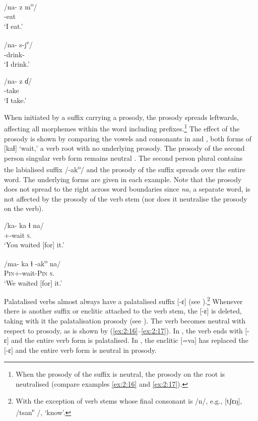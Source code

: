 \ea \label{ex:2:11}
\gll {[nɔ-zɔm]}   \hspace{10pt}   /na-  z m\textsuperscript{o}/\\
      {\oneS}-eat\\
\glt  ‘I eat.’
\z

\ea \label{ex:2:12}
\gll {[nɛ-ʃ-ɛ]}  /na-  s-j\textsuperscript{e}/\\
      {\oneS}-drink-{\CL}\\
\glt  ‘I drink.’
\z

\ea \label{ex:2:13}
\gll {[na-zaɗ]}  \hspace{10pt}    /na-  z ɗ/\\
      {\oneS}-take\\
\glt  ‘I take.’
\z

\largerpage
When initiated by a suffix carrying a prosody, the prosody spreads leftwards, affecting all morphemes within the word including prefixes.\footnote{When the prosody of the suffix is neutral, the prosody on the root is neutralised (compare examples \ref{ex:2:16} and \ref{ex:2:17}).} The effect of the prosody is shown by comparing the vowels and consonants in  and , both forms of [kaɬ] ‘wait,’ a verb root with no underlying prosody. The prosody of the second person singular verb form remains neutral . The second person plural contains the labialised suffix /-ak\textsuperscript{o}/  and the prosody of the suffix spreads over the entire word. The underlying forms are given in each example. Note that the prosody does not spread to the right across word boundaries since \textit{na}, a separate word, is not affected by the prosody of the verb stem (nor does it neutralise the prosody on the verb).

\ea \label{ex:2:14}
\gll [kà-kaɬ na] {\hspace{60pt}} /ka-  ka ɬ  na/\\
      {\twoS}+{\PFV}-wait    \textsc{s}.\DO\\
\glt  ‘You waited [for] it.'
\z

\ea \label{ex:2:15}
 /ma-  ka ɬ  -ak\textsuperscript{o} na/\\
      \textsc{Pin}+\PFV-wait-\textsc{Pin}  \textsc{s}.\DO\\
\glt  ‘We waited [for] it.'
\z

Palatalised verbs almost always have a palatalised suffix [{}-ɛ] (see ).\footnote{With the exception of verb stems whose final consonant is /n/, e.g., [tʃɛŋ], /tsan\textsuperscript{e }/, ‘know’.}  Whenever there is another suffix or enclitic attached to the verb stem, the [-ɛ] is deleted, taking with it the palatalisation prosody (see ). The verb becomes neutral with respect to prosody, as is shown by (\ref{ex:2:16}--\ref{ex:2:17}). In , the verb ends with [{}-ɛ] and the entire verb form is palatalised. In , the enclitic [=va] has replaced the [{}-ɛ] and the entire verb form is neutral in prosody.

